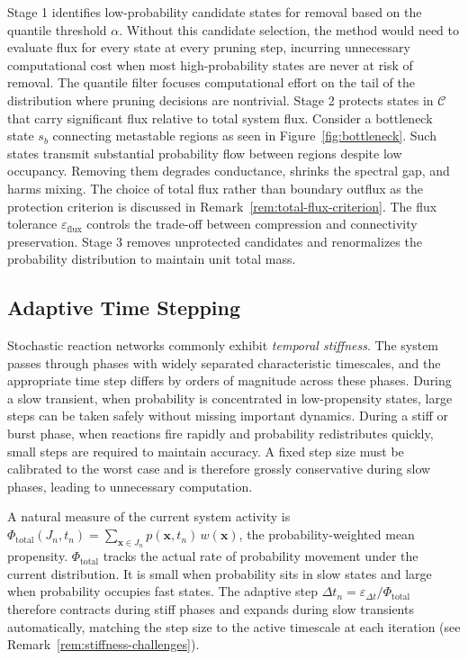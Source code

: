 \documentclass[onefignum,onetabnum]{siamart171218}
\begin{document}
Stage 1 identifies low-probability candidate states for removal based on the quantile threshold $\alpha$. Without this candidate selection, the method would need to evaluate flux for every state at every pruning step, incurring unnecessary computational cost when most high-probability states are never at risk of removal. The quantile filter focuses computational effort on the tail of the distribution where pruning decisions are nontrivial. Stage 2 protects states in $\mathcal{C}$ that carry significant flux relative to total system flux. Consider a bottleneck state $s_b$ connecting metastable regions as seen in Figure~\ref{fig:bottleneck}. Such states transmit substantial probability flow between regions despite low occupancy. Removing them degrades conductance, shrinks the spectral gap, and harms mixing. The choice of total flux rather than boundary outflux as the protection criterion is discussed in Remark~\ref{rem:total-flux-criterion}. The flux tolerance $\varepsilon_{\mathrm{flux}}$ controls the trade-off between compression and connectivity preservation. Stage 3 removes unprotected candidates and renormalizes the probability distribution to maintain unit total mass.


\subsection{Adaptive Time Stepping}

Stochastic reaction networks commonly exhibit \emph{temporal stiffness}. The system passes through phases with widely separated characteristic timescales, and the appropriate time step differs by orders of magnitude across these phases.  During a slow transient, when probability is concentrated in low-propensity states, large steps can be taken safely without missing important dynamics.  During a stiff or burst phase, when reactions fire rapidly and probability redistributes quickly, small steps are required to maintain accuracy.  A fixed step size must be calibrated to the worst case and is therefore grossly conservative during slow phases, leading to unnecessary computation.

A natural measure of the current system activity is $\Phi_{\mathrm{total}}(J_n,t_n) = \sum_{\boldsymbol{x}\in J_n}p(\boldsymbol{x},t_n)\,w(\boldsymbol{x})$, the probability-weighted mean propensity.  $\Phi_{\mathrm{total}}$ tracks the actual rate of probability movement under the current distribution. It is small when probability sits in slow states and large when probability occupies fast states.  The adaptive step $\Delta t_n = \varepsilon_{\Delta t}/\Phi_{\mathrm{total}}$ therefore contracts during stiff phases and expands during slow transients automatically, matching the step size to the active timescale at each iteration (see Remark~\ref{rem:stiffness-challenges}).
\end{document}
